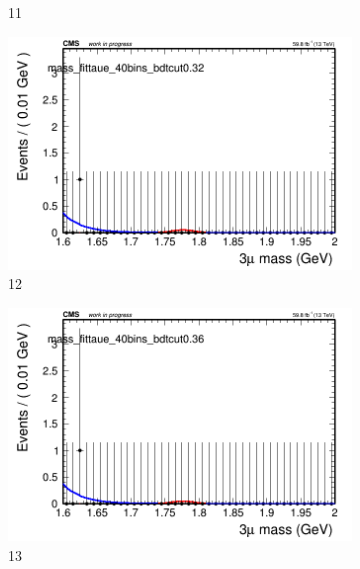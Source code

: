 \begin{figure}[h!]
\begin{subfigure}{0.2\textwidth}
        \caption{11}
    \end{subfigure}
    \begin{subfigure}{0.2\textwidth}
        \includegraphics[width=\textwidth]{unfixed_exp/plots/taue/massfit_taue_40bins_bdtcut0.32.png}
        \caption{12}
    \end{subfigure}
    \begin{subfigure}{0.2\textwidth}
        \includegraphics[width=\textwidth]{unfixed_exp/plots/taue/massfit_taue_40bins_bdtcut0.36.png}
        \caption{13}
    \end{subfigure}
    \begin{subfigure}{0.2\textwidth}

\end{subfigure}
\end{figure}

